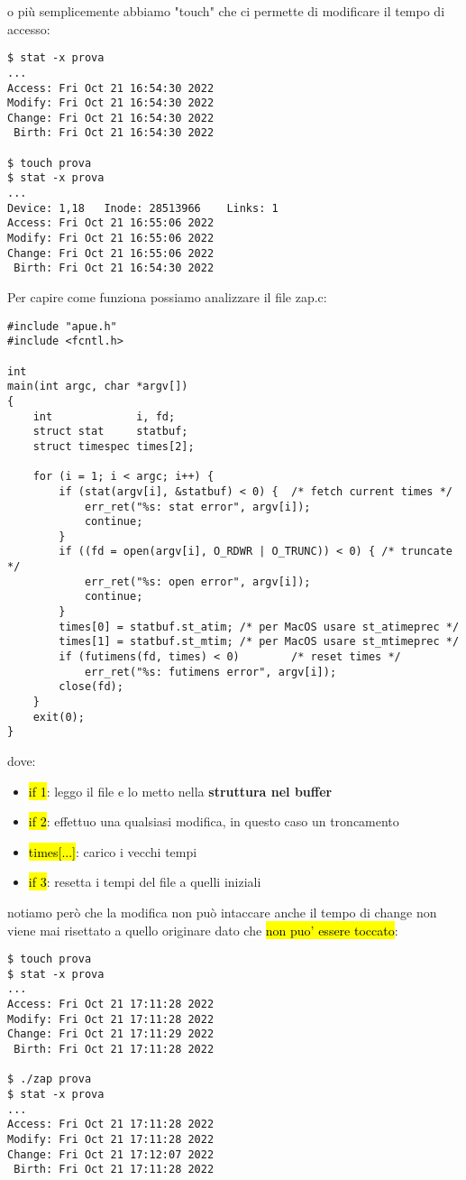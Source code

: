 o più semplicemente abbiamo "touch" che ci permette di modificare il tempo di accesso:

\begin{lstlisting}
$ stat -x prova
...
Access: Fri Oct 21 16:54:30 2022
Modify: Fri Oct 21 16:54:30 2022
Change: Fri Oct 21 16:54:30 2022
 Birth: Fri Oct 21 16:54:30 2022

$ touch prova
$ stat -x prova
...
Device: 1,18   Inode: 28513966    Links: 1
Access: Fri Oct 21 16:55:06 2022
Modify: Fri Oct 21 16:55:06 2022
Change: Fri Oct 21 16:55:06 2022
 Birth: Fri Oct 21 16:54:30 2022
\end{lstlisting}


Per capire come funziona possiamo analizzare il file zap.c:

\begin{lstlisting}
#include "apue.h"
#include <fcntl.h>

int
main(int argc, char *argv[])
{
	int				i, fd;
	struct stat		statbuf;
	struct timespec	times[2];

	for (i = 1; i < argc; i++) {
		if (stat(argv[i], &statbuf) < 0) {	/* fetch current times */
			err_ret("%s: stat error", argv[i]);
			continue;
		}
		if ((fd = open(argv[i], O_RDWR | O_TRUNC)) < 0) { /* truncate */
			err_ret("%s: open error", argv[i]);
			continue;
		}
		times[0] = statbuf.st_atim; /* per MacOS usare st_atimeprec */
		times[1] = statbuf.st_mtim; /* per MacOS usare st_mtimeprec */
		if (futimens(fd, times) < 0)		/* reset times */
			err_ret("%s: futimens error", argv[i]);
		close(fd);
	}
	exit(0);
}
\end{lstlisting}

dove:

\begin{itemize}
	\item \hl{if 1}: leggo il file e lo metto nella \textbf{struttura nel buffer}
	\item \hl{if 2}: effettuo una qualsiasi modifica, in questo caso un troncamento
	\item \hl{times[...]}: carico i vecchi tempi
	\item \hl{if 3}: resetta i tempi del file a quelli iniziali
\end{itemize}

notiamo però che la modifica non può intaccare anche il tempo di change non viene mai risettato a quello originare dato che \hl{non puo' essere toccato}:

\begin{lstlisting}
$ touch prova
$ stat -x prova
...
Access: Fri Oct 21 17:11:28 2022
Modify: Fri Oct 21 17:11:28 2022
Change: Fri Oct 21 17:11:29 2022
 Birth: Fri Oct 21 17:11:28 2022

$ ./zap prova
$ stat -x prova
...
Access: Fri Oct 21 17:11:28 2022
Modify: Fri Oct 21 17:11:28 2022
Change: Fri Oct 21 17:12:07 2022
 Birth: Fri Oct 21 17:11:28 2022
\end{lstlisting}


